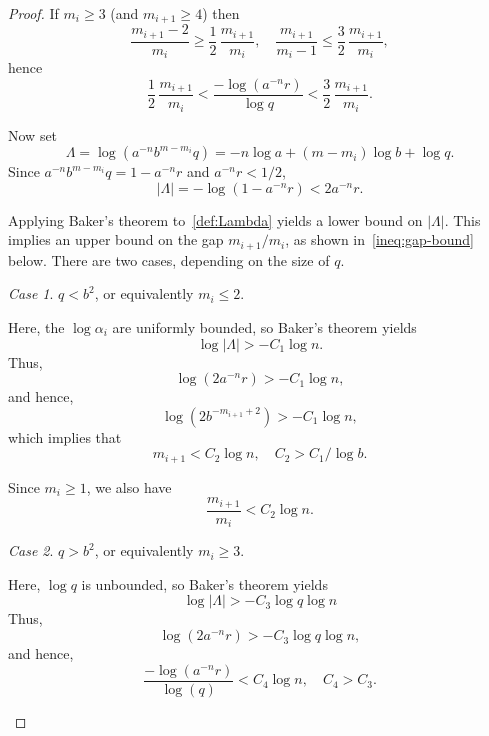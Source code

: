 \documentclass[12pt]{amsart}
\theoremstyle{remark}
\newtheorem{case}{Case}
\begin{document}
\begin{proof}
    If $m_i \ge 3$ (and $m_{i+1} \ge 4$) then
    \[
        \frac{m_{i+1}-2}{m_{i}} \ge \frac12\, \frac{m_{i+1}}{m_{i}},
        \quad
        \frac{m_{i+1}}{m_{i}-1} \le \frac32\, \frac{m_{i+1}}{m_{i}},
    \]
    hence
    \begin{equation} \label{ineq:ratio-estimate}
        \frac12\, \frac{m_{i+1}}{m_{i}} <
        \frac{-\log(a^{-n}r)}{\log q} <
        \frac32\, \frac{m_{i+1}}{m_{i}}.
    \end{equation}

    Now set
    \begin{equation} \label{def:Lambda}
        \Lambda = \log(a^{-n} b^{m - m_i} q) = -n \log a + (m - m_i) \log b + \log q.
    \end{equation}
    Since $a^{-n} b^{m-m_i}q = 1 - a^{-n}r$ and $a^{-n} r < 1/2$,
    \begin{equation} \label{ineq:Lambda-anr}
        |\Lambda| = -\log(1 - a^{-n} r) < 2 a^{-n} r.
    \end{equation}

    Applying Baker's theorem to~\eqref{def:Lambda} yields a lower bound on $|\Lambda|$.
    This implies an upper bound on the gap $m_{i+1}/m_i$, as shown in~\eqref{ineq:gap-bound} below.
    There are two cases, depending on the size of $q$.

    \begin{case} $q < b^2$, or equivalently $m_i \le 2$.

    Here, the $\log \alpha_i$ are uniformly bounded, so Baker's theorem yields
    \[
        \log |\Lambda| > -C_1 \log n.
    \]
    Thus,
    \[
        \log (2 a^{-n} r) > -C_1 \log n,
    \]
    and hence,
    \[
        \log (2 b^{-m_{i+1}+2}) > -C_1 \log n,
    \]
    which implies that
    \[
        m_{i+1} < C_2 \log n, \quad C_2 > C_1 / \log b.
    \]

    Since $m_{i} \ge 1$, we also have
    \[
        \frac{m_{i+1}}{m_{i}} < C_2 \log n.
    \]
    \end{case}

    \begin{case} $q > b^2$, or equivalently $m_{i} \ge 3$.

    Here, $\log q$ is unbounded, so Baker's theorem yields
    \[
        \log |\Lambda| > -C_3 \log q \log n
    \]
    Thus,
    \[
        \log (2 a^{-n} r) > -C_3 \log q \log n,
    \]
    and hence,
    \begin{equation} \label{ineq:Lambda-upper}
        \frac{-\log(a^{-n} r)}{\log(q)} < C_4 \log n, \quad C_4 > C_3.
    \end{equation}


\end{case}
\end{proof}
\end{document}
